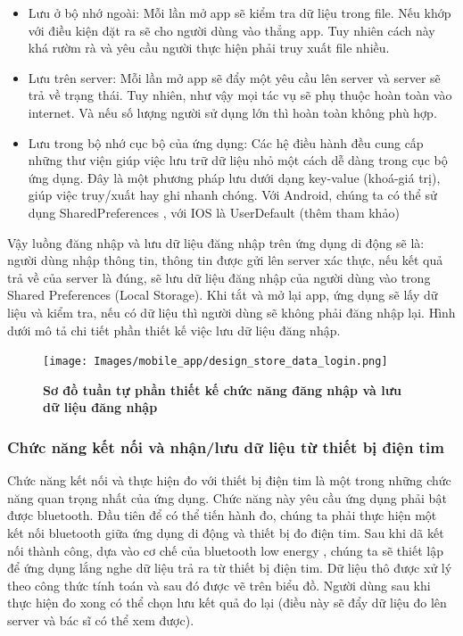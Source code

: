 \begin{itemize}
  \item Lưu ở bộ nhớ ngoài: Mỗi lần mở app sẽ kiểm tra dữ liệu trong file. Nếu khớp với điều kiện đặt ra sẽ cho người dùng vào thẳng app.
  Tuy nhiên cách này khá rườm rà và yêu cầu người thực hiện phải truy xuất file nhiều.
  \item Lưu trên server: Mỗi lần mở app sẽ đẩy một yêu cầu lên server và server sẽ trả về trạng thái. Tuy nhiên, như vậy mọi tác
  vụ sẽ phụ thuộc hoàn toàn vào internet. Và nếu số lượng người sử dụng lớn thì hoàn toàn không phù hợp.
  \item Lưu trong bộ nhớ cục bộ của ứng dụng: Các hệ điều hành đều cung cấp những thư viện giúp việc lưu trữ dữ liệu nhỏ một cách 
  dễ dàng trong cục bộ ứng dụng. Đây là một phương pháp lưu dưới dạng key-value (khoá-giá trị), giúp việc truy/xuất hay ghi nhanh chóng.
  Với Android, chúng ta có thể sử dụng SharedPreferences \cite{intro_sharedpref}, với IOS là UserDefault (thêm tham khảo)

\end{itemize}
Vậy luồng đăng nhập và lưu dữ liệu đăng nhập trên ứng dụng di động sẽ là: người dùng nhập thông tin, thông tin được gửi lên server xác thực,
nếu kết quả trả về của server là đúng, sẽ lưu dữ liệu đăng nhập của người dùng vào trong Shared Preferences (Local Storage). Khi tắt và mở lại app,
ứng dụng sẽ lấy dữ liệu và kiểm tra, nếu có dữ liệu thì người dùng sẽ không phải đăng nhập lại. Hình dưới mô tả chi tiết phần thiết
kế việc lưu dữ liệu đăng nhập.

\begin{figure}[H]
  \centering
  \texttt{[image: Images/mobile\_app/design\_store\_data\_login.png]}
  \caption[Sơ đồ tuần tự phần thiết kế chức năng đăng nhập và lưu dữ liệu đăng nhập]{\bfseries \fontsize{12pt}{0pt}
  \selectfont Sơ đồ tuần tự phần thiết kế chức năng đăng nhập và lưu dữ liệu đăng nhập}
  \label{seq_auth} %
\end{figure}

\subsubsection{Chức năng kết nối và nhận/lưu dữ liệu từ thiết bị điện tim}
\mbox{}
Chức năng kết nối và thực hiện đo với thiết bị điện tim là một trong những chức năng quan trọng nhất của ứng dụng. Chức năng này yêu cầu
ứng dụng phải bật được bluetooth. Đầu tiên để có thể tiến hành đo, chúng ta phải thực hiện một kết nối bluetooth giữa ứng dụng di động và
thiết bị đo điện tim. Sau khi dã kết nối thành công, dựa vào cơ chế của bluetooth low energy \cite{intro_ble}, chúng ta sẽ thiết lập để ứng dụng lắng
nghe dữ liệu trả ra từ thiết bị điện tim. Dữ liệu thô được xử lý theo công thức tính toán và sau đó được vẽ trên biểu đồ. Người dùng sau
khi thực hiện đo xong có thể chọn lưu kết quả đo lại (điều này sẽ đẩy dữ liệu đo lên server và bác sĩ có thể xem được).

